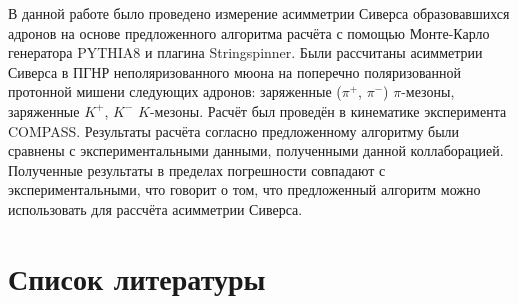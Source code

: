 \documentclass{extreport}
\begin{document}
В данной работе было проведено измерение асимметрии Сиверса образовавшихся адронов на основе предложенного алгоритма расчёта с помощью Монте-Карло генератора PYTHIA8 и плагина Stringspinner.  Были рассчитаны асимметрии Сиверса в ПГНР неполяризованного мюона на поперечно поляризованной протонной мишени следующих адронов: заряженные ($\pi^{+}$, $\pi^{-}$) $\pi$-мезоны, заряженные $K^{+}$, $K^{-}$ $K$-мезоны. Расчёт был проведён в кинематике эксперимента COMPASS. Результаты расчёта согласно предложенному алгоритму были сравнены с экспериментальными данными, полученными данной коллаборацией. Полученные результаты в пределах погрешности совпадают с экспериментальными, что говорит о том, что предложенный алгоритм можно использовать для рассчёта асимметрии Сиверса.
\newpage
\chapter*{Список литературы}

\thispagestyle{headings}
\printbibliography[heading=none]
\end{document}
